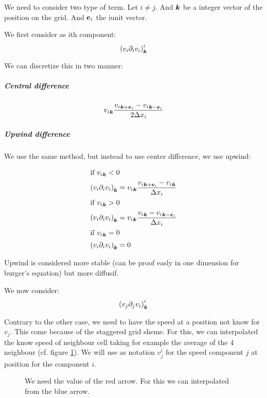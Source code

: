 We need to consider two type of term. Let $i\neq j$. And ${\boldsymbol {k}}$ be a integer vector of the position on the grid.
And ${\boldsymbol {e}}_i$ the i\th unit vector.

We first consider as ith component:
\begin{equation}
\left(v_{i}\partial_{i}v_{i}\right)^{i}_{{\boldsymbol {k}}}
\end{equation}

We can discretize this in two manner:

\subparagraph{Central difference}
\begin{equation}
{v_{i}}_{{\boldsymbol {k}}}\frac{{v_{i}}_{{\boldsymbol {k}}+{\boldsymbol {e}}_i}-{v_{i}}_{{\boldsymbol {k}}-{\boldsymbol {e}}_i}}{2\Delta x_{i}}
\end{equation}

\subparagraph{Upwind difference}

We use the same method, but instead to use center difference, we use upwind:

\begin{align}
\intertext{if ${v_{i}}_{{\boldsymbol {k}}}<0$}
\left(v_{i}\partial_{i}v_{i}\right)_{{\boldsymbol {k}}}&={v_{i}}_{{\boldsymbol {k}}}\frac{{v_{i}}_{{\boldsymbol {k}}+{\boldsymbol {e}}_i}-{v_{i}}_{{\boldsymbol {k}}}}{\Delta x_{i}}\\
\intertext{if ${v_{i}}_{{\boldsymbol {k}}}>0$}
\left(v_{i}\partial_{i}v_{i}\right)_{{\boldsymbol {k}}}&={v_{i}}_{{\boldsymbol {k}}}\frac{{v_{i}}_{{\boldsymbol {k}}}-{v_{i}}_{{\boldsymbol {k}}-{\boldsymbol {e}}_i}}{\Delta x_{i}}\\
\intertext{if ${v_{i}}_{{\boldsymbol {k}}}=0$}
\left(v_{i}\partial_{i}v_{i}\right)_{{\boldsymbol {k}}}&=0
\end{align}

Upwind is considered more stable (can be proof easly in one dimension for burger's equation) but more diffusif.

We now consider:
\begin{equation}
\left(v_{j}\partial_{j}v_{i}\right)^{i}_{{\boldsymbol {k}}}
\end{equation}

\begin{rem}
  Contrary to the other case, we need to have the speed at a position not know for $v_{j}$. This come because of the staggered grid sheme.
  For this, we can interpolated the know speed of neighbour cell taking for example the average of the 4 neighbour (cf. figure \ref{fixed:staggered_convection_upwind}).
  We will use as notation $v_{j}^{i}$ for the speed component $j$ at position for the component $i$.
  
  \begin{figure}
    \caption{We need the value of the red arrow. For this we can interpolated from the blue arrow.}
    \label{fixed:staggered_convection_upwind}
    \end{figure}
\end{rem}

